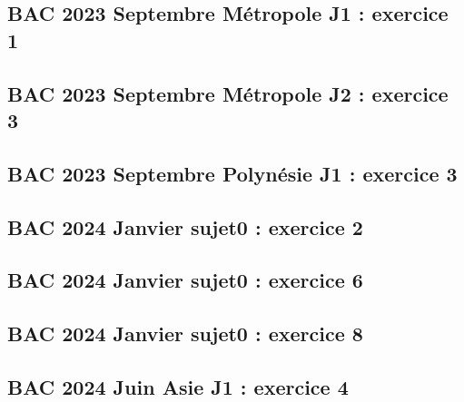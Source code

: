 \documentclass[lang=fr,edition=teacher,layout=sheet]{mxbook}
\begin{document}
\begingroup\endgroup
\par\bigskip
{}\subsection*{BAC 2023 Septembre Métropole J1 : exercice 1}
\begingroup\endgroup
\par\bigskip
{}\subsection*{BAC 2023 Septembre Métropole J2 : exercice 3}
\begingroup\endgroup
\par\bigskip
{}\subsection*{BAC 2023 Septembre Polynésie J1 : exercice 3}
\begingroup\endgroup
\par\bigskip
{}\subsection*{BAC 2024 Janvier sujet0 : exercice 2}
\begingroup\endgroup
\par\bigskip
{}\subsection*{BAC 2024 Janvier sujet0 : exercice 6}
\begingroup\endgroup
\par\bigskip
{}\subsection*{BAC 2024 Janvier sujet0 : exercice 8}
\begingroup\endgroup
\par\bigskip
{}\subsection*{BAC 2024 Juin Asie J1 : exercice 4}
\end{document}
